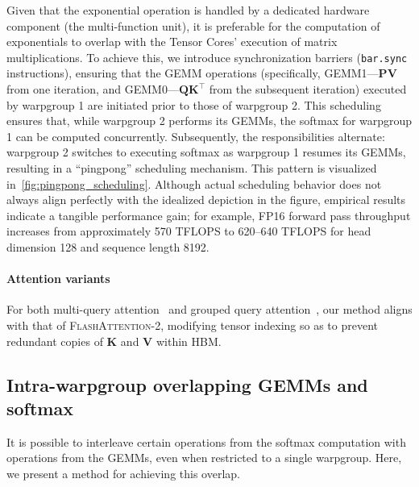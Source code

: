 Given that the exponential operation is handled by a dedicated hardware component (the multi-function unit), it is preferable for the computation of exponentials to overlap with the Tensor Cores' execution of matrix multiplications. To achieve this, we introduce synchronization barriers (\texttt{bar.sync} instructions), ensuring that the GEMM operations (specifically, GEMM1—$\mathbf{P} \mathbf{V}$ from one iteration, and GEMM0—$\mathbf{Q} \mathbf{K}^\top$ from the subsequent iteration) executed by warpgroup 1 are initiated prior to those of warpgroup 2. This scheduling ensures that, while warpgroup 2 performs its GEMMs, the softmax for warpgroup 1 can be computed concurrently. Subsequently, the responsibilities alternate: warpgroup 2 switches to executing softmax as warpgroup 1 resumes its GEMMs, resulting in a ``pingpong'' scheduling mechanism. This pattern is visualized in~\cref{fig:pingpong_scheduling}. Although actual scheduling behavior does not always align perfectly with the idealized depiction in the figure, empirical results indicate a tangible performance gain; for example, FP16 forward pass throughput increases from approximately 570 TFLOPS to 620–640 TFLOPS for head dimension 128 and sequence length 8192.

\paragraph{Attention variants} For both multi-query attention~\citep{shazeer2019fast} and grouped query attention~\citep{ainslie2023gqa}, our method aligns with that of \textsc{FlashAttention-2}, modifying tensor indexing so as to prevent redundant copies of $\mathbf{K}$ and $\mathbf{V}$ within HBM.

\subsection{Intra-warpgroup overlapping GEMMs and softmax}

It is possible to interleave certain operations from the softmax computation with operations from the GEMMs, even when restricted to a single warpgroup. Here, we present a method for achieving this overlap.

